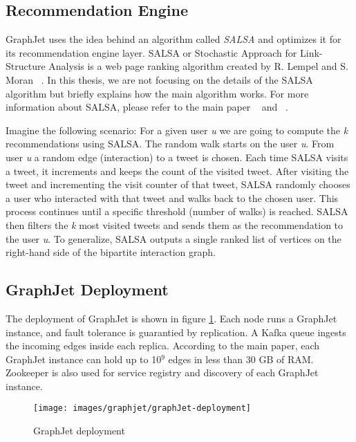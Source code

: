 \subsection{Recommendation Engine}
\label{subsec:GraphJet-Recommendation-Engine}
GraphJet uses the idea behind an algorithm called \emph{SALSA} and optimizes it for its recommendation engine layer. SALSA or Stochastic Approach for Link-Structure Analysis is a web page ranking algorithm created by R. Lempel and S. Moran ~\cite{lempelSALSAStochasticApproach2001}. In this thesis, we are not focusing on the details of the SALSA algorithm but briefly explains how the main algorithm works. For more information about SALSA, please refer to the main paper ~\cite{lempelSALSAStochasticApproach2001} and ~\cite{sharmaGraphJetRealtimeContent2016}.

Imagine the following scenario: For a given user \textit{u} we are going to compute the \textit{k} recommendations using SALSA. The random walk starts on the user \textit{u}. From user \textit{u} a random edge (interaction) to a tweet is chosen. Each time SALSA visits a tweet, it increments and keeps the count of the visited tweet. After visiting the tweet and incrementing the visit counter of that tweet, SALSA randomly chooses a user who interacted with that tweet and walks back to the chosen user. This process continues until a specific threshold (number of walks) is reached. SALSA then filters the \textit{k} most visited tweets and sends them as the recommendation to the user \textit{u}. To generalize, SALSA outputs a  single ranked list of vertices on the right-hand side of the bipartite interaction graph.

\subsection{GraphJet Deployment}
\label{subsec:GraphJet-Deployment}
The deployment of GraphJet is shown in figure \ref{fig:graphJet-deployment}. Each node runs a GraphJet instance, and fault tolerance is guarantied by replication. A Kafka queue ingests the incoming edges inside each replica. According to the main paper, each GraphJet instance can hold up to 10$^9$ edges in less than 30 GB of RAM. Zookeeper is also used for service registry and discovery of each GraphJet instance.
\begin{figure}[!h]
	\centering
	\texttt{[image: images/graphjet/graphJet-deployment]}
	\caption{GraphJet deployment}
	\label{fig:graphJet-deployment}
\end{figure}

